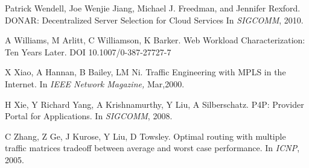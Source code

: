 \begin{thebibliography}{99}
	Patrick Wendell, Joe Wenjie Jiang, Michael J. Freedman, and Jennifer Rexford.
	DONAR: Decentralized Server Selection for Cloud Services
	In \emph{SIGCOMM}, 2010.

	A Williams, M Arlitt, C Williamson, K Barker.
	 Web Workload Characterization: Ten Years Later.
	 DOI	10.1007/0-387-27727-7

	X Xiao, A Hannan, B Bailey, LM Ni.
	Traffic Engineering with MPLS in the Internet.
	In \emph{  IEEE Network Magazine,} Mar,2000.


	H Xie, Y Richard Yang, A Krishnamurthy, Y Liu, A Silberschatz.
	 P4P: Provider Portal for Applications.
	 In \emph{SIGCOMM},
	 2008.




	C Zhang, Z Ge, J Kurose, Y Liu, D Towsley.
	Optimal routing with multiple traffic matrices tradeoff between average and worst case performance.
	In \emph{ICNP},
	2005.
	













%







\end{thebibliography}
